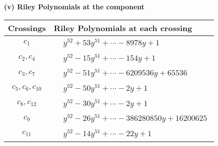 \documentclass[1p]{elsarticle_modified}
\theoremstyle{definition}
\begin{document}
\flushleft \textbf{(v) Riley Polynomials at the component}\newline \\
\begin{tabular}{m{50pt}|m{274pt}}
Crossings & \hspace{64pt}Riley Polynomials at each crossing \\
\hline $$\begin{aligned}c_{1}\end{aligned}$$&$\begin{aligned}
&y^{52}+53 y^{51}+\cdots-8978 y+1
\end{aligned}$\\
\hline $$\begin{aligned}c_{2},c_{4}\end{aligned}$$&$\begin{aligned}
&y^{52}-15 y^{51}+\cdots-154 y+1
\end{aligned}$\\
\hline $$\begin{aligned}c_{3},c_{7}\end{aligned}$$&$\begin{aligned}
&y^{52}-51 y^{51}+\cdots-6209536 y+65536
\end{aligned}$\\
\hline $$\begin{aligned}c_{5},c_{6},c_{10}\end{aligned}$$&$\begin{aligned}
&y^{52}-50 y^{51}+\cdots-2 y+1
\end{aligned}$\\
\hline $$\begin{aligned}c_{8},c_{12}\end{aligned}$$&$\begin{aligned}
&y^{52}-30 y^{51}+\cdots-2 y+1
\end{aligned}$\\
\hline $$\begin{aligned}c_{9}\end{aligned}$$&$\begin{aligned}
&y^{52}-26 y^{51}+\cdots-386280850 y+16200625
\end{aligned}$\\
\hline $$\begin{aligned}c_{11}\end{aligned}$$&$\begin{aligned}
&y^{52}-14 y^{51}+\cdots-22 y+1
\end{aligned}$\\
\hline
\end{tabular}\\~\\
\end{document}
